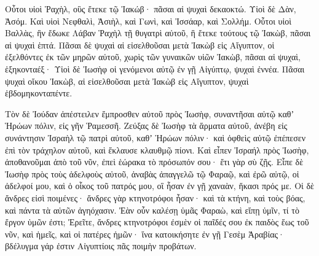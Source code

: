{Οὗτοι υἱοὶ Ῥαχὴλ, οὓς ἔτεκε τῷ Ἰακώβ· πᾶσαι αἱ ψυχαὶ δεκαοκτώ.
Υἱοὶ δὲ Δὰν, Ἀσόμ.
Καὶ υἱοὶ Νεφθαλὶ, Ἀσιὴλ, καὶ Γωνὶ, καὶ Ἰσσάαρ, καὶ Σολλήμ.
Οὗτοι υἱοὶ Βαλλὰς, ἣν ἔδωκε Λάβαν Ῥαχὴλ τῇ θυγατρὶ αὐτοῦ, ἣ ἔτεκε τούτους τῷ Ἰακὼβ, πᾶσαι αἱ ψυχαὶ ἑπτά.
Πᾶσαι δὲ ψυχαὶ αἱ εἰσελθοῦσαι μετὰ Ἰακὼβ εἰς Αἴγυπτον, οἱ ἐξελθόντες ἐκ τῶν μηρῶν αὐτοῦ, χωρὶς τῶν γυναικῶν υἱῶν Ἰακὼβ, πᾶσαι αἱ ψυχαὶ, ἑξηκονταέξ·
Υἱοὶ δὲ Ἰωσὴφ οἱ γενόμενοι αὐτῷ ἐν γῇ Αἰγύπτῳ, ψυχαὶ ἐννέα. Πᾶσαι ψυχαὶ οἴκου Ἰακὼβ, αἱ εἰσελθοῦσαι μετὰ Ἰακὼβ εἰς Αἴγυπτον, ψυχαὶ ἑβδομηκονταπέντε.
\par }{\PP {}Τὸν δὲ Ἰούδαν ἀπέστειλεν ἔμπροσθεν αὐτοῦ πρὸς Ἰωσὴφ, συναντῆσαι αὐτῷ καθʼ Ἡρώων πόλιν, εἰς γῆν Ῥαμεσσῆ.
Ζεύξας δὲ Ἰωσὴφ τὰ ἅρματα αὐτοῦ, ἀνέβη εἰς συνάντησιν Ἰσραὴλ τῷ πατρὶ αὐτοῦ, καθʼ Ἡρώων πόλιν· καὶ ὀφθεὶς αὐτῷ ἐπέπεσεν ἐπὶ τὸν τράχηλον αὐτοῦ, καὶ ἔκλαυσε κλαυθμῷ πίονι.
Καὶ εἶπεν Ἰσραήλ πρὸς Ἰωσὴφ, ἀποθανοῦμαι ἀπὸ τοῦ νῦν, ἐπεὶ ἑώρακα τὸ πρόσωπόν σου· ἔτι γὰρ σὺ ζῇς.
Εἶπε δὲ Ἰωσὴφ πρὸς τοὺς ἀδελφοὺς αὐτοῦ, ἀναβὰς ἀπαγγελῶ τῷ Φαραῷ, καὶ ἐρῶ αὐτῷ, οἱ ἀδελφοί μου, καὶ ὁ οἶκος τοῦ πατρός μου, οἳ ἦσαν ἐν γῇ χαναὰν, ἥκασι πρός με.
Οἱ δὲ ἄνδρες εἰσὶ ποιμένες· ἄνδρες γὰρ κτηνοτρόφοι ἦσαν· καὶ τὰ κτήνη, καὶ τοὺς βόας, καὶ πάντα τὰ αὐτῶν ἀγηόχασιν.
Ἐὰν οὖν καλέσῃ ὑμᾶς Φαραὼ, καὶ εἴπῃ ὑμῖν, τί τὸ ἔργον ὑμῶν ἐστι;
Ἐρεῖτε, ἄνδρες κτηνοτρόφοι ἐσμὲν οἱ παῖδές σου ἐκ παιδὸς ἕως τοῦ νῦν, καὶ ἡμεῖς, καὶ οἱ πατέρες ἡμῶν· ἵνα κατοικήσητε ἐν γῇ Γεσὲμ Ἀραβίας· βδέλυγμα γάρ ἐστιν Αἰγυπτίοις πᾶς ποιμὴν προβάτων.

}
